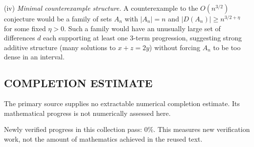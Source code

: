 \smallskip
\noindent
(iv) \emph{Minimal counterexample structure.}
A counterexample to the $O(n^{3/2})$ conjecture would be a family of sets $A_n$ with $|A_n|=n$ and $|D(A_n)|\ge n^{3/2+\eta}$ for some fixed $\eta>0$. Such a family would have an unusually large set of differences $d$ each supporting at least one 3-term progression, suggesting strong additive structure (many solutions to $x+z=2y$) without forcing $A_n$ to be too dense in an interval.



\subsection*{COMPLETION ESTIMATE}
The primary source supplies no extractable numerical completion estimate. Its mathematical progress is not numerically assessed here.

Newly verified progress in this collection pass: $0\%$. This measures new verification work, not the amount of mathematics achieved in the reused text.
